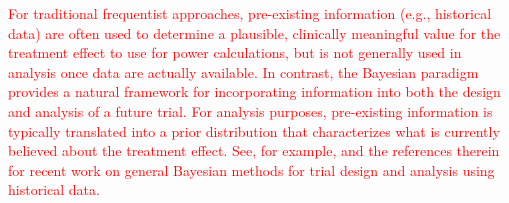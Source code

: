 \documentclass[12pt]{article}
\begin{document}
\textcolor{red}{
%
For traditional frequentist approaches, pre-existing information (e.g., historical data) are often used to determine a plausible, clinically meaningful 
value for the treatment effect to use for power calculations, but is not generally used in analysis once data are actually available.
%
In contrast, the Bayesian paradigm provides a natural framework for incorporating information into both the design and analysis of a future trial.
%
For analysis purposes, pre-existing information is typically translated into a prior distribution that characterizes what is currently believed about the treatment effect.
%
See, for example, \cite{Psioda2018} and the references therein for recent work on general Bayesian methods for trial design and analysis using historical data.
%
%
%
}

%
\end{document}
